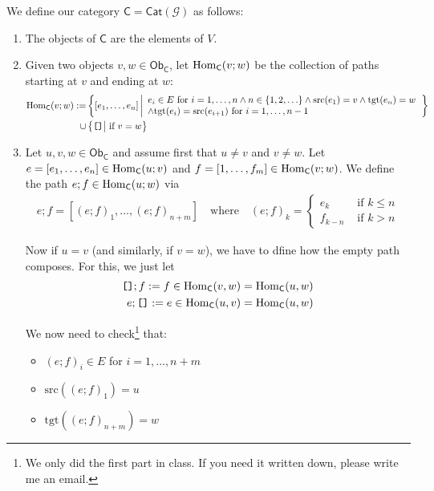 We define our category $\textsf{C} = \textsf{Cat}(\mathcal{G})$ as follows:
\begin{enumerate}
  \item The objects of $\textsf{C}$ are the elements of $V$.
  \item Given two objects $v,w \in \textsf{Ob}_{\textsf{C}}$, let $\operatorname{Hom}_{\textsf{C}}(v;w)$ be the collection of paths starting at $v$ and ending at $w$:
    \begin{align*}
      \operatorname{Hom}_{\textsf{C}}(v;w)
      :=
      &\left\{
        [e_1,\ldots,e_n]
        \left\vert
        \begin{array}{l}
        e_i \in E \text{ for $i = 1,\ldots,n$}
        \land
        n \in \{1,2,\ldots\}
        \land
        \text{src}(e_1) = v 
        \land \text{tgt}(e_n) = w
        \\
        \land
        \text{tgt}(e_{i}) = \text{src}(e_{i+1}) \text{ for $i = 1,\ldots, n-1$}
        \end{array} 
        \right.
      \right\}
      \\
      \cup{}
      &\left\{
        \texttt{[]} \big\vert{} \text{\ if } v = w
      \right\}
    \end{align*}
  \item Let $u,v,w \in \textsf{Ob}_{\textsf{C}}$ and assume first that $u \neq v$ and $v \neq w$.
    Let $e = [e_1,\ldots,e_n] \in \operatorname{Hom}_{\textsf{C}}(u;v)$ and $f = [1,\ldots,f_m] \in \operatorname{Hom}_{\textsf{C}}(v;w)$.
    We define the path $e;f \in \operatorname{Hom}_{\textsf{C}}(u;w)$ via
    \begin{align*}
      e;f = [{(e;f)}_1,\ldots,{(e;f)}_{n+m}]
      \quad \text{where} \quad 
      {(e;f)}_k = \left\{\begin{array}{ll}
        e_k & \text{ if } k \leq n\\
        f_{k-n}& \text{ if } k > n
      \end{array} \right.
    \end{align*}

    Now if $u = v$ (and similarly, if $v = w$), we have to dfine how the empty path composes. For this, we just let
    \begin{align}
      \texttt{[]};f := f \in \operatorname{Hom}_{\textsf{C}}(v,w) = \operatorname{Hom}_{\textsf{C}}(u,w)\label{eq:id-left}
      \\
      e;\texttt{[]} := e \in \operatorname{Hom}_{\textsf{C}}(u,v) = \operatorname{Hom}_{\textsf{C}}(u,w) \label{eq:id-right}
    \end{align}

    We now need to check\footnote{We only did the first part in class. If you need it written down, please write me an email.} that:
    \begin{itemize}
      \item ${(e;f)}_i \in E$ for $i = 1,\ldots, n+m$
      \item $\text{src}({(e;f)}_1) = u$
      \item $\text{tgt}({(e;f)}_{n+m}) = w$
    \end{itemize}


\end{enumerate}
